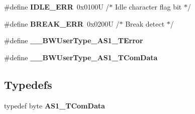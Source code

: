 \begin{DoxyCompactItemize}
\item 
\#define {\bfseries I\+D\+L\+E\+\_\+\+E\+RR}~0x0100\+U       /$\ast$ Idle character flag bit   $\ast$/\hypertarget{group___a_s1__module_ga4584e89e739c19496724ba117e62aed9}{}\label{group___a_s1__module_ga4584e89e739c19496724ba117e62aed9}

\item 
\#define {\bfseries B\+R\+E\+A\+K\+\_\+\+E\+RR}~0x0200\+U       /$\ast$ Break detect              $\ast$/\hypertarget{group___a_s1__module_ga0cb4d61ee3347eb62142ca0eb1d02a53}{}\label{group___a_s1__module_ga0cb4d61ee3347eb62142ca0eb1d02a53}

\item 
\#define {\bfseries \+\_\+\+\_\+\+B\+W\+User\+Type\+\_\+\+A\+S1\+\_\+\+T\+Error}\hypertarget{group___a_s1__module_ga88b60b019dfe95745d800b2c9a0d2197}{}\label{group___a_s1__module_ga88b60b019dfe95745d800b2c9a0d2197}

\item 
\#define {\bfseries \+\_\+\+\_\+\+B\+W\+User\+Type\+\_\+\+A\+S1\+\_\+\+T\+Com\+Data}\hypertarget{group___a_s1__module_ga5deab30f29af11135db490a516abd823}{}\label{group___a_s1__module_ga5deab30f29af11135db490a516abd823}

\end{DoxyCompactItemize}
\subsection*{Typedefs}
\begin{DoxyCompactItemize}
\item 
typedef byte {\bfseries A\+S1\+\_\+\+T\+Com\+Data}\hypertarget{group___a_s1__module_ga621222f7d90195f6b0edb2abeb534e3b}{}\label{group___a_s1__module_ga621222f7d90195f6b0edb2abeb534e3b}

\end{DoxyCompactItemize}
